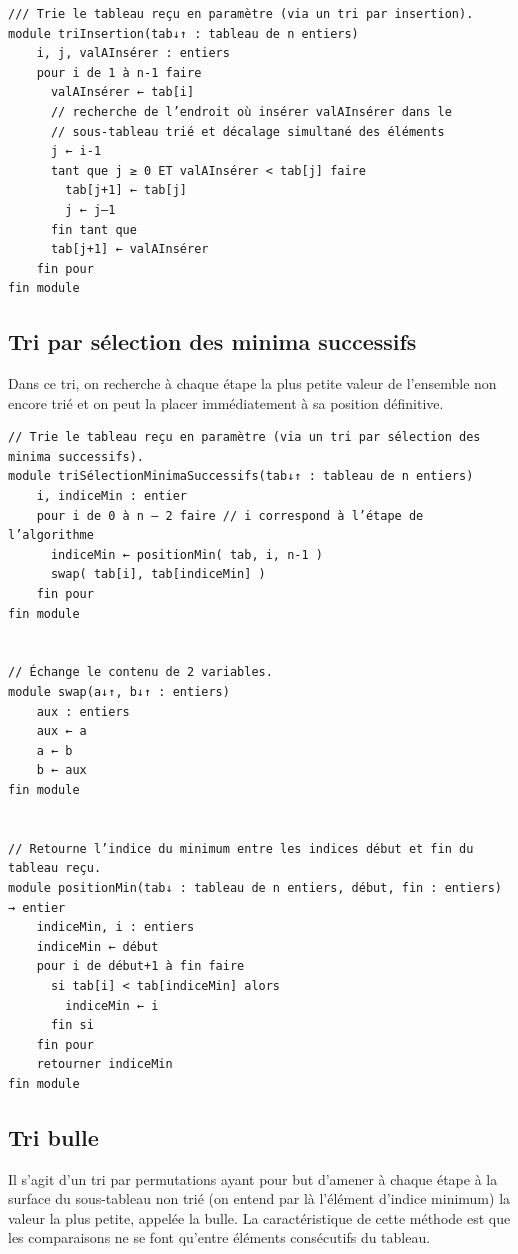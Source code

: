 \documentclass[11pt,a4paper]{article}
\begin{document}
            \par
        \begin{verbatim}
/// Trie le tableau reçu en paramètre (via un tri par insertion).
module triInsertion(tab↓↑ : tableau de n entiers)
    i, j, valAInsérer : entiers
    pour i de 1 à n-1 faire
      valAInsérer ← tab[i]
      // recherche de l’endroit où insérer valAInsérer dans le
      // sous-tableau trié et décalage simultané des éléments
      j ← i-1
      tant que j ≥ 0 ET valAInsérer < tab[j] faire
        tab[j+1] ← tab[j]
        j ← j–1
      fin tant que
      tab[j+1] ← valAInsérer
    fin pour
fin module
\end{verbatim}\subsection{Tri par s\'election des minima successifs}
		    Dans ce tri, on recherche \`a chaque \'etape la plus petite valeur de l'ensemble non encore tri\'e
        et on peut la placer imm\'ediatement \`a sa position d\'efinitive.
      
            \par
        \begin{verbatim}
// Trie le tableau reçu en paramètre (via un tri par sélection des minima successifs).
module triSélectionMinimaSuccessifs(tab↓↑ : tableau de n entiers)
    i, indiceMin : entier
    pour i de 0 à n – 2 faire // i correspond à l’étape de l’algorithme
      indiceMin ← positionMin( tab, i, n-1 )
      swap( tab[i], tab[indiceMin] )
    fin pour
fin module


// Échange le contenu de 2 variables.
module swap(a↓↑, b↓↑ : entiers)
    aux : entiers
    aux ← a
    a ← b
    b ← aux
fin module


// Retourne l’indice du minimum entre les indices début et fin du tableau reçu.
module positionMin(tab↓ : tableau de n entiers, début, fin : entiers) → entier
    indiceMin, i : entiers
    indiceMin ← début
    pour i de début+1 à fin faire
      si tab[i] < tab[indiceMin] alors
        indiceMin ← i
      fin si
    fin pour
    retourner indiceMin
fin module

      \end{verbatim}\subsection{Tri bulle}
		    Il s'agit d'un tri par permutations ayant pour but d'amener \`a chaque \'etape \`a la \guillemotleft  surface \guillemotright 
        du sous-tableau non tri\'e (on entend par l\`a l'\'el\'ement d'indice minimum) la valeur la plus
        petite, appel\'ee la bulle. La caract\'eristique de cette m\'ethode est que les comparaisons ne se
        font qu'entre \'el\'ements cons\'ecutifs du tableau.
		  
\end{document}
